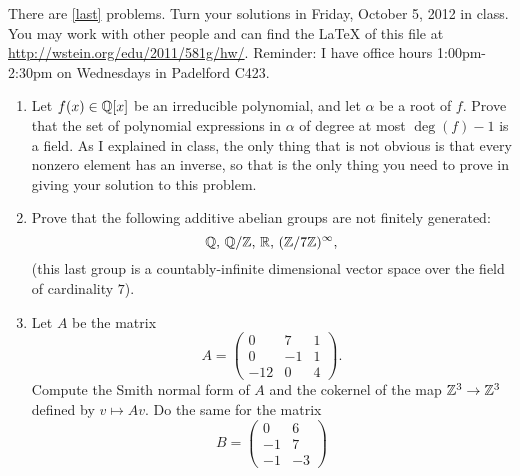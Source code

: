 \documentclass{article}
\title{\dred{Math 581e, Fall 2012, Homework 1}}
\author{William Stein ({\tt wstein@uw.edu})}
\date{Due: Friday, October 5, 2012}
\begin{document}
\maketitle

{\color{dbluecolor}There are \ref{last} problems. Turn your solutions in Friday, October
5, 2012 in class.  You may work with other people and can find the
\LaTeX{} of this file at \url{http://wstein.org/edu/2011/581g/hw/}.
Reminder: I have office hours 1:00pm-2:30pm on Wednesdays in Padelford
C423.}

\begin{enumerate}

\item Let $f(x) \in \mathbb{Q}[x]$ be an irreducible polynomial, and let $\alpha$ be a root of $f$.
Prove that the set of polynomial expressions in $\alpha$ of degree at most $\deg(f)-1$ 
is a field.  As I explained in class, the only thing that is not obvious is that
every nonzero element has an inverse, so that is the only thing you need to prove 
in giving your solution to this problem.   

\item Prove that the following additive abelian groups are not finitely generated:
$$\mathbb{Q},\, \mathbb{Q}/\mathbb{Z},\, \mathbb{R},\, (\mathbb{Z}/7\mathbb{Z})^{\infty},$$ (this last group is a
  countably-infinite dimensional vector space over the field of
  cardinality $7$).  

\item\label{last} Let $A$ be the matrix 
$$A=\left(\begin{array}{rrr}
0 & 7 & 1 \\
0 & -1 & 1 \\
-12 & 0 & 4
\end{array}\right).$$
Compute the Smith normal form of $A$ and the cokernel of the map $\mathbb{Z}^3\to \mathbb{Z}^3$ defined by
$v\mapsto Av$.  Do the same for the matrix 
$$B=\left(\begin{array}{rr}
0 & 6 \\
-1 & 7 \\
-1 & -3
\end{array}\right)$$


\end{enumerate}
\end{document}
